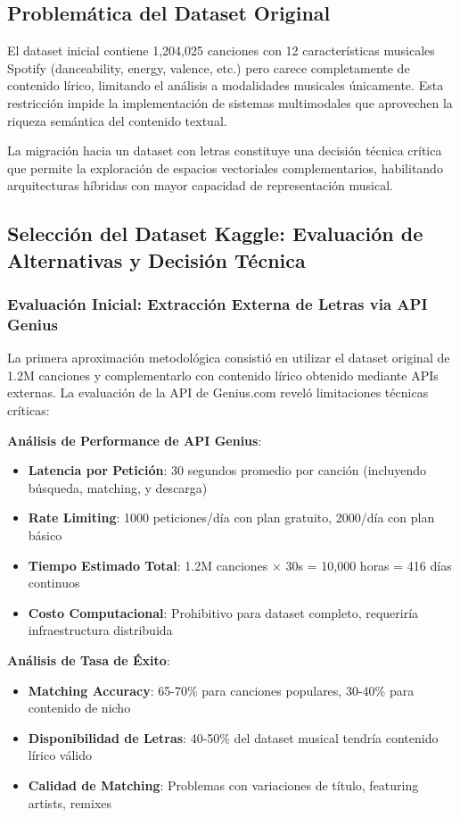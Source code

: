 \documentclass[12pt,a4paper]{report}
\begin{document}
\subsection{Problemática del Dataset Original}

El dataset inicial contiene 1,204,025 canciones con 12 características musicales Spotify (danceability, energy, valence, etc.) pero carece completamente de contenido lírico, limitando el análisis a modalidades musicales únicamente. Esta restricción impide la implementación de sistemas multimodales que aprovechen la riqueza semántica del contenido textual.

La migración hacia un dataset con letras constituye una decisión técnica crítica que permite la exploración de espacios vectoriales complementarios, habilitando arquitecturas híbridas con mayor capacidad de representación musical.

\subsection{Selección del Dataset Kaggle: Evaluación de Alternativas y Decisión Técnica}

\subsubsection{Evaluación Inicial: Extracción Externa de Letras via API Genius}

La primera aproximación metodológica consistió en utilizar el dataset original de 1.2M canciones y complementarlo con contenido lírico obtenido mediante APIs externas. La evaluación de la API de Genius.com reveló limitaciones técnicas críticas:

\textbf{Análisis de Performance de API Genius}:
\begin{itemize}
\item \textbf{Latencia por Petición}: 30 segundos promedio por canción (incluyendo búsqueda, matching, y descarga)
\item \textbf{Rate Limiting}: 1000 peticiones/día con plan gratuito, 2000/día con plan básico
\item \textbf{Tiempo Estimado Total}: 1.2M canciones × 30s = 10,000 horas = 416 días continuos
\item \textbf{Costo Computacional}: Prohibitivo para dataset completo, requeriría infraestructura distribuida
\end{itemize}

\textbf{Análisis de Tasa de Éxito}:
\begin{itemize}
\item \textbf{Matching Accuracy}: 65-70\% para canciones populares, 30-40\% para contenido de nicho
\item \textbf{Disponibilidad de Letras}: 40-50\% del dataset musical tendría contenido lírico válido
\item \textbf{Calidad de Matching}: Problemas con variaciones de título, featuring artists, remixes
\end{itemize}
\end{document}
